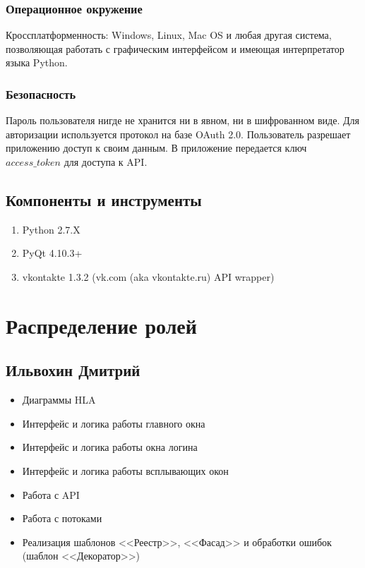 \documentclass[12pt]{article}
\begin{document}
\subsubsection{Операционное окружение}
Кроссплатформенность: Windows, Linux, Mac OS и любая другая система, позволяющая работать с графическим интерфейсом и имеющая интерпретатор языка Python.

\subsubsection{Безопасность}
Пароль пользователя нигде не хранится ни в явном, ни в шифрованном виде. Для авторизации используется протокол на базе OAuth 2.0.
Пользователь разрешает приложению доступ к своим данным. В приложение передается ключ $access\_token$ для доступа к API. 

\subsection{Компоненты и инструменты} 
\begin{enumerate}
\item Python 2.7.X
\item PyQt 4.10.3+
\item vkontakte 1.3.2 (vk.com (aka vkontakte.ru) API wrapper)
\end{enumerate}



\newpage
\section{Распределение ролей}
\subsection{Ильвохин Дмитрий}
\begin{itemize}
\setlength{\itemsep}{-1mm} %
\item Диаграммы HLA
\item Интерфейс и логика работы главного окна
\item Интерфейс и логика работы окна логина
\item Интерфейс и логика работы всплывающих окон
\item Работа с API
\item Работа с потоками
\item Реализация шаблонов <<Реестр>>, <<Фасад>> и обработки ошибок (шаблон <<Декоратор>>)
\end{itemize}
\end{document}
